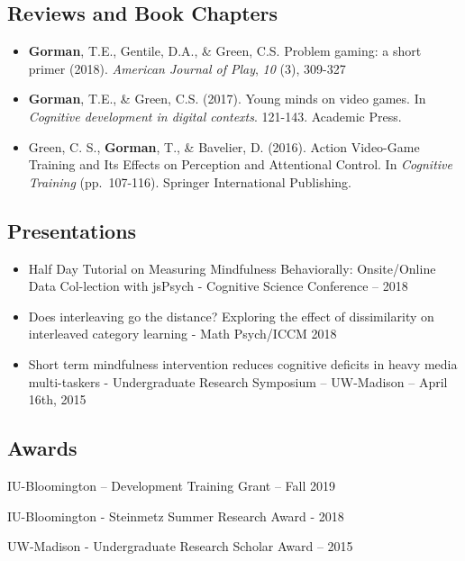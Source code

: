 \documentclass[
  11pt,
  letterpaper,
]{article}
\providecommand{\tightlist}{%
  \setlength{\itemsep}{0pt}\setlength{\parskip}{0pt}}\usepackage{longtable,booktabs,array}
\begin{document}
\subsection*{Reviews and Book Chapters}\label{reviews-and-book-chapters}

\begin{itemize}
\item
  \textbf{Gorman}, T.E., Gentile, D.A., \& Green, C.S. Problem gaming: a
  short primer (2018). \emph{American Journal of Play}, \emph{10} (3),
  309-327
\item
  \textbf{Gorman}, T.E., \& Green, C.S. (2017). Young minds on video
  games. In \emph{Cognitive development in digital contexts}. 121-143.
  Academic Press.
\item
  Green, C. S., \textbf{Gorman}, T., \& Bavelier, D. (2016). Action
  Video-Game Training and Its Effects on Perception and Attentional
  Control. In \emph{Cognitive Training} (pp.~107-116). Springer
  International Publishing.
\end{itemize}

\subsection*{Presentations}\label{presentations}

\begin{itemize}
\tightlist
\item
  Half Day Tutorial on Measuring Mindfulness Behaviorally: Onsite/Online
  Data Col-lection with jsPsych - Cognitive Science Conference -- 2018
\item
  Does interleaving go the distance? Exploring the effect of
  dissimilarity on interleaved category learning - Math Psych/ICCM 2018
\item
  Short term mindfulness intervention reduces cognitive deficits in
  heavy media multi-taskers - Undergraduate Research Symposium --
  UW-Madison -- April 16th, 2015
\end{itemize}

\subsection*{Awards}\label{awards}

IU-Bloomington -- Development Training Grant -- Fall 2019

IU-Bloomington - Steinmetz Summer Research Award - 2018

UW-Madison - Undergraduate Research Scholar Award -- 2015
\end{document}
